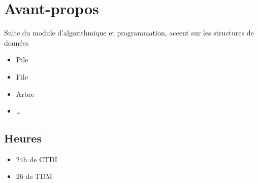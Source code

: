 \documentclass[12pt,a4paper,openany]{book}
\begin{document}
	\dominitoc
	\setcounter{tocdepth}{1}
	\setcounter{secnumdepth}{3}
	\setcounter{minitocdepth}{1}
	\maketitle
	\chapter*{Avant-propos}
	Suite du module d'algorithmique et programmation, accent sur les structures de données
	\begin{itemize}
		\item Pile
		\item File
		\item Arbre
		\item \ldots
	\end{itemize}
	\section*{Heures}
	\begin{itemize}
		\item 24h de CTDI
		\item 26 de TDM
	\end{itemize}
\end{document}
